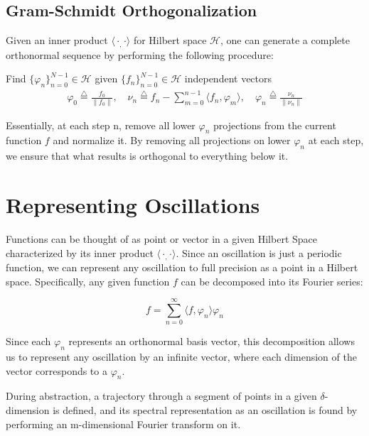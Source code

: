 \documentclass{MastersDoctoralThesis}
\def\innerproduct{\langle\cdot _, \cdot\rangle}
\begin{document}
\subsection{Gram-Schmidt Orthogonalization}
Given an inner product $\innerproduct$ for Hilbert space $\mathcal{H}$, one can generate a complete orthonormal sequence by performing the following procedure:

Find $\{ \varphi_n \}_{n=0}^{N-1} \in \mathcal{H}$ given $\{ f_n \}_{n=0}^{N-1} \in \mathcal{H}$ independent vectors
\begin{equation}
\begin{gathered}
  \varphi_0 \overset{\bigtriangleup}{=} \frac{f_0}{\| f_0 \|} , \quad
  \nu_n \overset{\bigtriangleup}{=} f_n - \sum_{m=0}^{n-1} \langle f_n , \varphi_m \rangle , \quad
  \varphi_n \overset{\bigtriangleup}{=} \frac{\nu_n}{\| \nu_n \|}
\end{gathered}
\end{equation}

Essentially, at each step n, remove all lower $\varphi_n$ projections from the current function $f$ and normalize it.  By removing all projections on lower $\varphi_n$ at each step, we ensure that what results is orthogonal to everything below it. 

\section{Representing Oscillations}

Functions can be thought of as point or vector in a given Hilbert Space characterized by its inner product $\innerproduct$. Since an oscillation is just a periodic function, we can represent any oscillation to full precision as a point in a Hilbert space.  Specifically, any given function $f$ can be decomposed into its Fourier series:

\begin{equation}
  f = \sum_{n=0}^\infty \langle f, \varphi_n \rangle \varphi_n
\end{equation}

Since each $\varphi_n$ represents an orthonormal basis vector, this decomposition allows us to represent any oscillation by an infinite vector, where each dimension of the vector corresponds to a $\varphi_n$.

During abstraction, a trajectory through a segment of points in a given $\delta$-dimension is defined, and its spectral representation as an oscillation is found by performing an m-dimensional Fourier transform on it.
\end{document}
